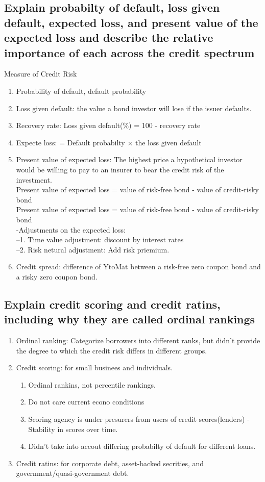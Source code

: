 \documentclass{article}
\newcommand{\be}{\begin{enumerate}}
\newcommand{\ee}{\end{enumerate}}
\begin{document}
\subsection{Explain probabilty of default, loss given default, expected loss, and present
value of the expected loss and describe the relative importance of each across the credit spectrum}
Measure of Credit Risk
\be
    \item Probability of default, default probability
    \item Loss given default: the value a bond investor will lose if the issuer defaults.
    \item Recovery rate: Loss given default(\%) = 100 - recovery rate
    \item Expecte loss: = Default probabilty $\times$ the loss given default
    \item Present value of expected loss: The highest price a hypothetical investor would
    be willing to pay to an insurer to bear the credit risk of the investment.
    \\Present value of expected loss = value of risk-free bond - value of credit-risky bond
    \\Present value of expected loss = value of risk-free bond - value of credit-risky bond
        \\-Adjustments on the expected loss:
        \\--1. Time value adjustment: discount by interest rates
        \\--2. Risk netural adjustment: Add risk priemium.
    \item Credit spread: difference of YtoMat between  a risk-free zero coupon bond
    and a risky zero coupon bond.
\ee
\subsection{Explain credit scoring and credit ratins, including why they are called
ordinal rankings}
\be
    \item Ordinal ranking: Categorize borrowers into different ranks, but didn't provide the degree
to which the credit risk differs in different groups.
    \item Credit scoring: for small businees and individuals.
        \be
            \item Ordinal rankins, not percentile rankings.
            \item Do not care current econo conditions
            \item Scoring agency is under presurers from users of credit scores(lenders) - Stability in scores
            over time.
            \item Didn't take into accout differing probabilty of default for different loans.
        \ee
    \item Credit ratins: for corporate debt, asset-backed secrities, and 
    government/quasi-government debt.
\ee
\end{document}
